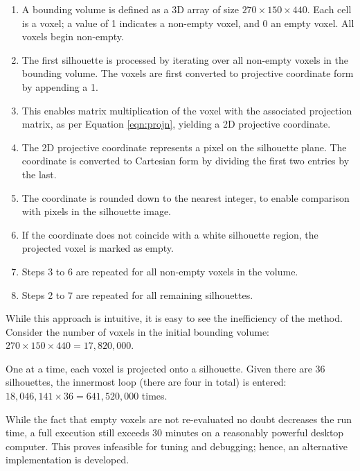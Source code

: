 \begin{enumerate}
  \item A bounding volume is defined as a 3D array of size $270\times150\times440$. Each cell is a voxel; a value of 1 indicates a non-empty voxel, and 0 an empty voxel. All voxels begin non-empty.

  \item The first silhouette is processed by iterating over all non-empty voxels in the bounding volume. The voxels are first converted to projective coordinate form by appending a 1.

  \item This enables matrix multiplication of the voxel with the associated projection matrix, as per Equation \ref{eqn:projn}, yielding a 2D projective coordinate.

  \item The 2D projective coordinate represents a pixel on the silhouette plane. The coordinate is converted to Cartesian form by dividing the first two entries by the last.

  \item The coordinate is rounded down to the nearest integer, to enable comparison with pixels in the silhouette image.

  \item If the coordinate does not coincide with a white silhouette region, the projected voxel is marked as empty.

  \item Steps 3 to 6 are repeated for all non-empty voxels in the volume.

  \item Steps 2 to 7 are repeated for all remaining silhouettes.

\end{enumerate}

While this approach is intuitive, it is easy to see the inefficiency of the method. Consider the number of voxels in the initial bounding volume: $270\times150\times440=17,820,000$.

One at a time, each voxel is projected onto a silhouette. Given there are 36 silhouettes, the innermost loop (there are four in total) is entered: $18,046,141\times36=641,520,000$ times.

While the fact that empty voxels are not re-evaluated no doubt decreases the run time, a full execution still exceeds 30 minutes on a reasonably powerful desktop computer. This proves infeasible for tuning and debugging; hence, an alternative implementation is developed.

